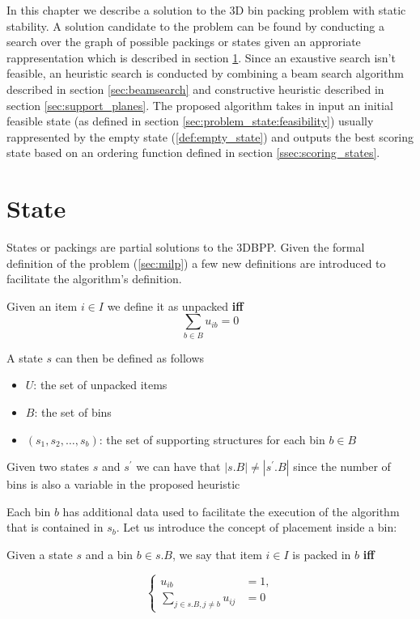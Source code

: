 In this chapter we describe a solution to the 3D bin packing problem with static stability.
A solution candidate to the problem can be found by conducting a search over the graph of possible packings or states given an approriate rappresentation which is described in section \ref{sec:problem_state}.
Since an exaustive search isn't feasible, an heuristic search is conducted by combining a beam search algorithm described in section \ref{sec:beamsearch} and constructive heuristic described in section \ref{sec:support_planes}.
The proposed algorithm takes in input an initial feasible state (as defined in section \ref{sec:problem_state:feasibility}) usually rappresented by the empty state (\ref{def:empty_state}) and outputs the best scoring state based on an ordering function defined in section \ref{ssec:scoring_states}.

\section{State}
\label{sec:problem_state}%
States or packings are partial solutions to the 3DBPP. Given the formal definition of the problem (\ref{sec:milp}) a few new definitions are introduced to facilitate the algorithm's definition.
\begin{definition}
    Given an item $i \in I$ we define it as unpacked \textbf{iff}
    \begin{equation*}
        \sum_{b \in B} u_{ib} = 0
    \end{equation*}
\end{definition}
A state $s$ can then be defined as follows
\begin{itemize}
    \item $U$: the set of unpacked items
    \item $B$: the set of bins
    \item $(s_1, s_2,\dots, s_b)$: the set of supporting structures for each bin $b \in B$
\end{itemize}

\begin{observation}
    Given two states $s$ and $s^\prime$ we can have that $|s.B| \neq |s^\prime.B|$ since the number of bins is also a variable in the proposed heuristic
\end{observation}

Each bin $b$ has additional data used to facilitate the execution of the algorithm that is contained in $s_b$. 
Let us introduce the concept of placement inside a bin:
\begin{definition}
    Given a state $s$ and a bin $b \in s.B$, we say that item $i \in I$ is packed in $b$ \textbf{iff} 
    
    \begin{equation*}
        \left\{ 
            \begin{aligned}
                u_{ib} & = 1, \\
                \sum_{j \in s.B, j \neq b}{u_{ij}} & = 0
            \end{aligned}
        \right.
    \end{equation*}
\end{definition}
